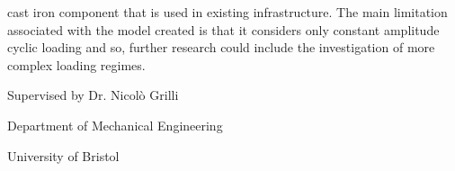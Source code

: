 \documentclass[11pt,a4paper]{article}
\begin{document}
cast iron component that is used in existing infrastructure. The main limitation associated with the model created is that it considers only constant amplitude cyclic loading and so, further research could include the investigation of more complex loading regimes.

\bigskip

\bigskip

\bigskip

\bigskip

\begin{center}
\fontsize{14}{\baselineskip}\selectfont  Supervised by Dr. Nicolò Grilli

\bigskip

\fontsize{14}{\baselineskip}\selectfont Department of Mechanical Engineering

\bigskip

\fontsize{14}{\baselineskip}\selectfont University of Bristol

\bigskip

\fontsize{14}{\baselineskip}

\end{center}
\bigskip
\bigskip
\bigskip
\bigskip
\bigskip
\bigskip
\bigskip
\bigskip
\bigskip
\bigskip
\bigskip
\bigskip
\bigskip
\bigskip
\bigskip
\bigskip
\bigskip
\bigskip
\bigskip
\bigskip
\bigskip
\bigskip
\bigskip
\bigskip
\bigskip
\bigskip
\bigskip
\bigskip
\bigskip
\bigskip
\bigskip
\bigskip
\bigskip
\bigskip
\bigskip
\bigskip
\bigskip
\bigskip
\bigskip
\bigskip
\bigskip
\bigskip
\bigskip
\bigskip
\bigskip
\bigskip
\bigskip
\bigskip
\bigskip
\end{document}
